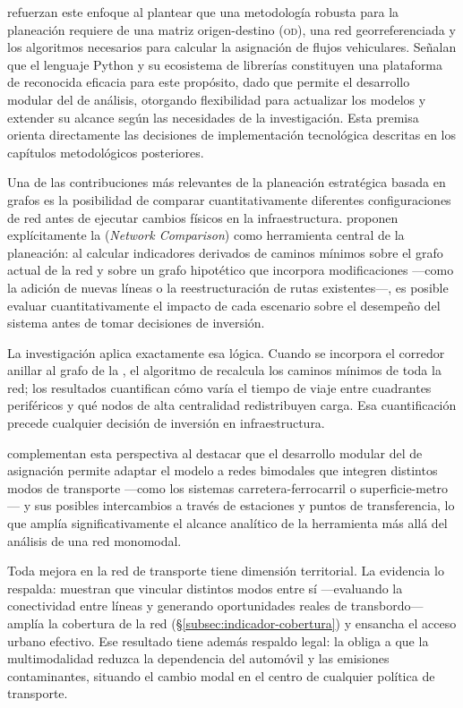 \citet{moreno2023} refuerzan este enfoque al plantear que una metodología
robusta para la planeación requiere de una matriz origen-destino (\textsc{od}),
una red georreferenciada y los algoritmos necesarios para calcular la asignación
de flujos vehiculares. Señalan que el lenguaje Python y su ecosistema de
librerías constituyen una plataforma de reconocida eficacia para este propósito,
dado que permite el desarrollo modular del  de análisis, otorgando
flexibilidad para actualizar los modelos y extender su alcance según las
necesidades de la investigación. Esta premisa orienta directamente las
decisiones de implementación tecnológica descritas en los capítulos
metodológicos posteriores.

Una de las contribuciones más relevantes de la planeación estratégica basada en
grafos es la posibilidad de comparar cuantitativamente diferentes
configuraciones de red antes de ejecutar cambios físicos en la infraestructura.
\citet{fortin2016innovative} proponen explícitamente la
 (\textit{Network Comparison}) como herramienta
central de la planeación: al calcular indicadores derivados de caminos mínimos
sobre el grafo actual de la red y sobre un grafo hipotético que incorpora
modificaciones ---como la adición de nuevas líneas o la reestructuración de
rutas existentes---, es posible evaluar cuantitativamente el impacto de cada
escenario sobre el desempeño del sistema antes de tomar decisiones de inversión.

La investigación aplica exactamente esa lógica. Cuando se incorpora el corredor
anillar al grafo de la \zmvm{}, el algoritmo de \dijkstra{} recalcula los
caminos mínimos de toda la red; los resultados cuantifican cómo varía el tiempo
de viaje entre cuadrantes periféricos y qué nodos de alta centralidad
redistribuyen carga. Esa cuantificación precede cualquier decisión de inversión
en infraestructura.

\citet{moreno2023} complementan esta perspectiva al destacar que el desarrollo
modular del  de asignación permite adaptar el modelo a redes bimodales
que integren distintos modos de transporte ---como los sistemas
carretera-ferrocarril o superficie-metro--- y sus posibles intercambios a través
de estaciones y puntos de transferencia, lo que amplía significativamente el
alcance analítico de la herramienta más allá del análisis de una red monomodal.

Toda mejora en la red de transporte tiene dimensión territorial. La evidencia lo
respalda: \citet{ugur2025} muestran que vincular distintos modos entre sí
---evaluando la conectividad entre líneas y generando oportunidades reales de
transbordo--- amplía la cobertura de la red (§\ref{subsec:indicador-cobertura}) y
ensancha el acceso urbano efectivo. Ese resultado tiene además respaldo legal:
la \citet{lgmsv2022} obliga a que la multimodalidad reduzca la dependencia del
automóvil y las emisiones contaminantes, situando el cambio modal en el centro
de cualquier política de transporte.

